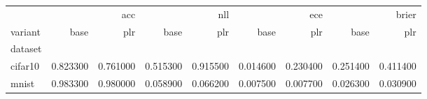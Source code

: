 \begin{tabular}{lrrrrrrrr}
\toprule
 & \multicolumn{2}{r}{acc} & \multicolumn{2}{r}{nll} & \multicolumn{2}{r}{ece} & \multicolumn{2}{r}{brier} \\
variant & base & plr & base & plr & base & plr & base & plr \\
dataset &  &  &  &  &  &  &  &  \\
\midrule
cifar10 & 0.823300 & 0.761000 & 0.515300 & 0.915500 & 0.014600 & 0.230400 & 0.251400 & 0.411400 \\
mnist & 0.983300 & 0.980000 & 0.058900 & 0.066200 & 0.007500 & 0.007700 & 0.026300 & 0.030900 \\
\bottomrule
\end{tabular}
